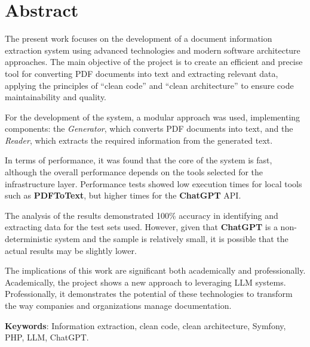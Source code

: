 \newpage
\section*{Abstract}
The present work focuses on the development of a document information extraction system using advanced technologies and
modern software architecture approaches.
The main objective of the project is to create an efficient and precise tool for converting PDF documents into text and
extracting relevant data, applying the principles of ``clean code'' and ``clean architecture'' to ensure code
maintainability and quality.

For the development of the system, a modular approach was used, implementing components: the \textit{Generator}, which
converts PDF documents into text, and the \textit{Reader}, which extracts the required information from the generated
text.

In terms of performance, it was found that the core of the system is fast, although the overall performance depends on
the tools selected for the infrastructure layer.
Performance tests showed low execution times for local tools such as \textbf{PDFToText}, but higher times for the
\textbf{ChatGPT} API.

The analysis of the results demonstrated 100\% accuracy in identifying and extracting data for the test sets used.
However, given that \textbf{ChatGPT} is a non-deterministic system and the sample is relatively small, it is
possible that the actual results may be slightly lower.

The implications of this work are significant both academically and professionally.
Academically, the project shows a new approach to leveraging LLM systems.
Professionally, it demonstrates the potential of these technologies to transform the way companies and organizations
manage documentation.

\vspace{1cm}

\textbf{Keywords}: Information extraction, clean code, clean architecture, Symfony, PHP, LLM, ChatGPT.

